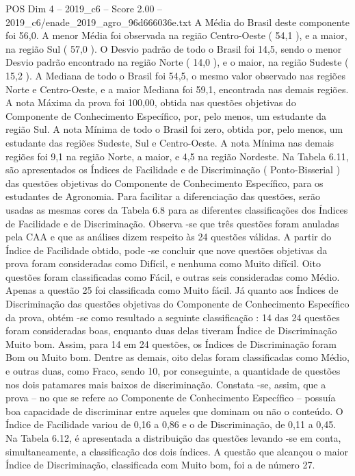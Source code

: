 \begin{textsample}{POS Dim 4 – 2019\_c6 – Score 2.00 – 2019\_c6/enade\_2019\_agro\_96d666036e.txt}
A Média do Brasil deste componente foi 56,0.
A menor Média foi observada na região Centro-Oeste ( 54,1 ), e a maior, na região Sul ( 57,0 ).
O Desvio padrão de todo o Brasil foi 14,5, sendo o menor Desvio padrão encontrado na região Norte ( 14,0 ), e o maior, na região Sudeste ( 15,2 ).
A Mediana de todo o Brasil foi 54,5, o mesmo valor observado nas regiões Norte e Centro-Oeste, e a maior Mediana foi 59,1, encontrada nas demais regiões.
A nota Máxima da prova foi 100,00, obtida nas questões objetivas do Componente de Conhecimento Específico, por, pelo menos, um estudante da região Sul.
A nota Mínima de todo o Brasil foi zero, obtida por, pelo menos, um estudante das regiões Sudeste, Sul e Centro-Oeste.
A nota Mínima nas demais regiões foi 9,1 na região Norte, a maior, e 4,5 na região Nordeste.
Na Tabela 6.11, são apresentados os Índices de Facilidade e de Discriminação ( Ponto-Bisserial ) das questões objetivas do Componente de Conhecimento Específico, para os estudantes de Agronomia.
Para facilitar a diferenciação das questões, serão usadas as mesmas cores da Tabela 6.8 para as diferentes classificações dos Índices de Facilidade e de Discriminação.
Observa -se que três questões foram anuladas pela CAA e que as análises dizem respeito às 24 questões válidas.
A partir do Índice de Facilidade obtido, pode -se concluir que nove questões objetivas da prova foram consideradas como Difícil, e nenhuma como Muito difícil.
Oito questões foram classificadas como Fácil, e outras seis consideradas como Médio.
Apenas a questão 25 foi classificada como Muito fácil.
Já quanto aos Índices de Discriminação das questões objetivas do Componente de Conhecimento Específico da prova, obtém -se como resultado a seguinte classificação : 14 das 24 questões foram consideradas boas, enquanto duas delas tiveram Índice de Discriminação Muito bom.
Assim, para 14 em 24 questões, os Índices de Discriminação foram Bom ou Muito bom.
Dentre as demais, oito delas foram classificadas como Médio, e outras duas, como Fraco, sendo 10, por conseguinte, a quantidade de questões nos dois patamares mais baixos de discriminação.
Constata -se, assim, que a prova – no que se refere ao Componente de Conhecimento Específico – possuía boa capacidade de discriminar entre aqueles que dominam ou não o conteúdo.
O Índice de Facilidade variou de 0,16 a 0,86 e o de Discriminação, de 0,11 a 0,45.
Na Tabela 6.12, é apresentada a distribuição das questões levando -se em conta, simultaneamente, a classificação dos dois índices.
A questão que alcançou o maior Índice de Discriminação, classificada com Muito bom, foi a de número 27.

\end{textsample}
